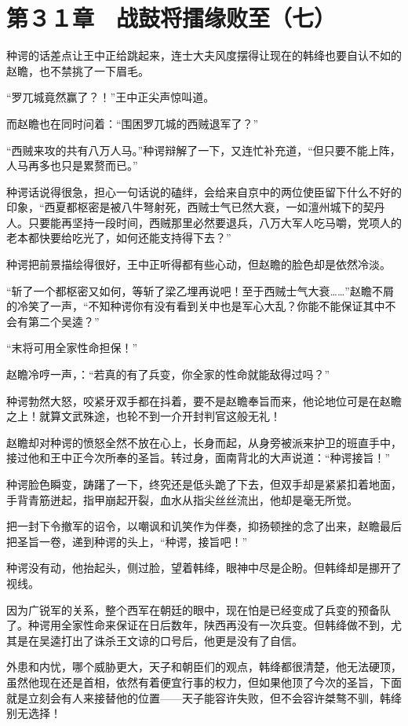 \section{第３１章　战鼓将擂缘败至（七）}

种谔的话差点让王中正给跳起来，连士大夫风度摆得让现在的韩绛也要自认不如的赵瞻，也不禁挑了一下眉毛。

“罗兀城竟然赢了？！”王中正尖声惊叫道。

而赵瞻也在同时问着：“围困罗兀城的西贼退军了？”

“西贼来攻的共有八万人马。”种谔辩解了一下，又连忙补充道，“但只要不能上阵，人马再多也只是累赘而已。”

种谔话说得很急，担心一句话说的磕绊，会给来自京中的两位使臣留下什么不好的印象，“西夏都枢密是被八牛弩射死，西贼士气已然大衰，一如澶州城下的契丹人。只要能再坚持一段时间，西贼那里必然要退兵，八万大军人吃马嚼，党项人的老本都快要给吃光了，如何还能支持得下去？”

种谔把前景描绘得很好，王中正听得都有些心动，但赵瞻的脸色却是依然冷淡。

“斩了一个都枢密又如何，等斩了梁乙埋再说吧！至于西贼士气大衰……”赵瞻不屑的冷笑了一声，“不知种谔你有没有看到关中也是军心大乱？你能不能保证其中不会有第二个吴逵？”

“末将可用全家性命担保！”

赵瞻冷哼一声，：“若真的有了兵变，你全家的性命就能敌得过吗？”

种谔勃然大怒，咬紧牙双手都在抖着，要不是赵瞻奉旨而来，他论地位可是在赵瞻之上！就算文武殊途，也轮不到一介开封判官这般无礼！

赵瞻却对种谔的愤怒全然不放在心上，长身而起，从身旁被派来护卫的班直手中，接过他和王中正今次所奉的圣旨。转过身，面南背北的大声说道：“种谔接旨！”

种谔脸色瞬变，踌躇了一下，终究还是低头跪了下去，但双手却是紧紧扣着地面，手背青筋迸起，指甲崩起开裂，血水从指尖丝丝流出，他却是毫无所觉。

把一封下令撤军的诏令，以嘲讽和讥笑作为伴奏，抑扬顿挫的念了出来，赵瞻最后把圣旨一卷，递到种谔的头上，“种谔，接旨吧！”

种谔没有动，他抬起头，侧过脸，望着韩绛，眼神中尽是企盼。但韩绛却是挪开了视线。

因为广锐军的关系，整个西军在朝廷的眼中，现在怕是已经变成了兵变的预备队了。种谔用全家性命来保证在日后数年，陕西再没有一次兵变。但韩绛做不到，尤其是在吴逵打出了诛杀王文谅的口号后，他更是没有了自信。

外患和内忧，哪个威胁更大，天子和朝臣们的观点，韩绛都很清楚，他无法硬顶，虽然他现在还是首相，依然有着便宜行事的权力，但如果他顶了今次的圣旨，下面就是立刻会有人来接替他的位置——天子能容许失败，但不会容许桀骜不驯，韩绛别无选择！

